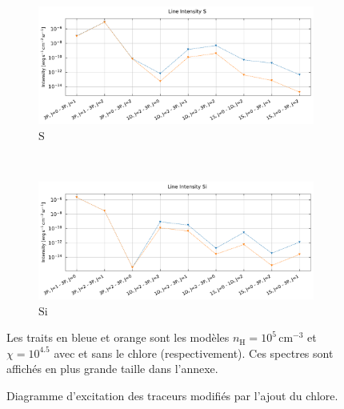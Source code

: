 \begin{figure}[!h]
    \begin{subfigure}[t]{0.49\textwidth} %
        \centering \includegraphics[trim = {0 0 0 1cm},clip,width=1\textwidth]{figure/Cl/gridModelEmiss/I_comp_S.pdf}
        \caption{$\mathrm{S}$}
    \end{subfigure}
    ~
    \begin{subfigure}[t]{0.49\textwidth} %
        \centering \includegraphics[trim = {0 0 0 1cm},clip,width=1\textwidth]{figure/Cl/gridModelEmiss/I_comp_Si.pdf}
        \caption{$\mathrm{Si}$}
    \end{subfigure}
    
    \caption{Diagramme d'excitation des traceurs modifiés par l'ajout du chlore.}
    \begin{minipage}{\textwidth}
    Les traits en bleue et orange sont les modèles $n_\mathrm{H}=10^5 \, \mathrm{cm}^{-3}$ et $\chi=10^{4.5}$ avec et sans le chlore (respectivement). Ces spectres sont affichés en plus grande taille dans l'annexe.
    \end{minipage}
    \label{fig:Cl:gridModelEmiss:yes}
\end{figure}

